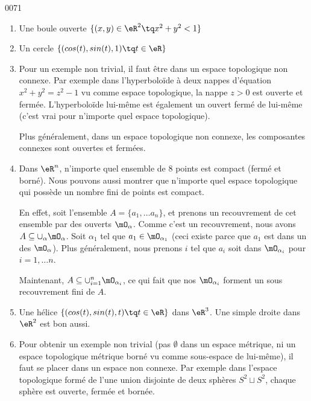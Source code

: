 
\begin{corrige}{0071}

\begin{enumerate}
	\item Une boule ouverte $\{ (x,y) \in \eR^2 \tq x^2+y^2 < 1\}$
	\item Un cercle $\{ (cos(t),sin(t),1) \tq t \in \eR\}$
	\item Pour un exemple non trivial, il faut être dans un espace topologique non connexe. Par exemple dans l'hyperboloïde à deux nappes d'équation $x^2 + y^2 = z^2 - 1$ vu comme espace topologique, la nappe $z > 0$ est ouverte et fermée. L'hyperboloïde lui-même est également un ouvert fermé de lui-même (c'est vrai pour n'importe quel espace topologique).

		Plus généralement, dans un espace topologique non connexe, les composantes connexes sont ouvertes et fermées.
	\item Dans $\eR^n$, n'importe quel ensemble de $8$ points est compact (fermé et borné). Nous pouvons aussi montrer que n'importe quel espace topologique qui possède un nombre fini de points est compact. 

En effet, soit l'ensemble $A=\{ a_1,\ldots a_n \}$, et prenons un recouvrement de cet ensemble par des ouverts $\mO_{\alpha}$. Comme c'est un recouvrement, nous avons $A\subseteq\cup_{\alpha}\mO_{\alpha}$. Soit $\alpha_1$ tel que $a_1\in\mO_{\alpha_1}$ (ceci existe parce que $a_1$ est dans un des $\mO_{\alpha}$). Plus généralement, nous prenons $i$ tel que $a_i$ soit dans $\mO_{\alpha_i}$ pour $i=1,\ldots n$. 

Maintenant, $A\subseteq\cup_{i=1}^n\mO_{\alpha_i}$, ce qui fait que nos $\mO_{\alpha_i}$ forment un sous recouvrement fini de $A$.

	\item Une hélice $\{ (cos(t),sin(t),t) \tq t \in \eR\}$ dans $\eR^3$. Une simple droite dans $\eR^2$ est bon aussi.
	\item Pour obtenir un exemple non trivial (pas $\emptyset$ dans un espace métrique, ni un espace topologique métrique borné vu comme sous-espace de lui-même), il faut se placer dans un espace non connexe. Par exemple dans l'espace topologique formé de l'une union disjointe de deux sphères $S^2 \sqcup S^2$, chaque sphère est ouverte, fermée et bornée.
\end{enumerate}

\end{corrige}
